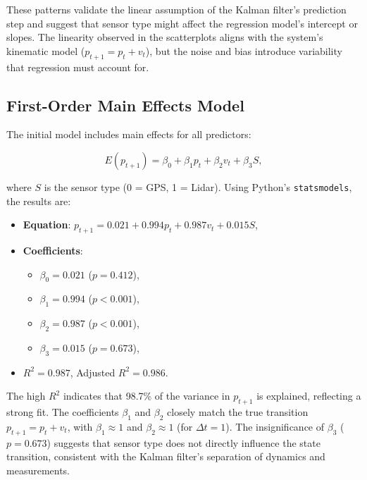 \documentclass[12pt]{article}
\begin{document}
These patterns validate the linear assumption of the Kalman filter’s prediction step and suggest that sensor type might affect the regression model’s intercept or slopes. The linearity observed in the scatterplots aligns with the system’s kinematic model (\( p_{t+1} = p_t + v_t \)), but the noise and bias introduce variability that regression must account for.

\subsection{First-Order Main Effects Model}
\label{subsec:main_effects}

The initial model includes main effects for all predictors:

\begin{equation}
    E(p_{t+1}) = \beta_0 + \beta_1 p_t + \beta_2 v_t + \beta_3 S,
    \label{eq:main_effects}
\end{equation}

where \( S \) is the sensor type (0 = GPS, 1 = Lidar). Using Python’s \texttt{statsmodels}, the results are:

\begin{itemize}
    \item \textbf{Equation}: \( p_{t+1} = 0.021 + 0.994 p_t + 0.987 v_t + 0.015 S \),
    \item \textbf{Coefficients}:
    \begin{itemize}
        \item \( \beta_0 = 0.021 \) (\( p = 0.412 \)),
        \item \( \beta_1 = 0.994 \) (\( p < 0.001 \)),
        \item \( \beta_2 = 0.987 \) (\( p < 0.001 \)),
        \item \( \beta_3 = 0.015 \) (\( p = 0.673 \)),
    \end{itemize}
    \item \( R^2 = 0.987 \), Adjusted \( R^2 = 0.986 \).
\end{itemize}

The high \( R^2 \) indicates that 98.7\% of the variance in \( p_{t+1} \) is explained, reflecting a strong fit. The coefficients \( \beta_1 \) and \( \beta_2 \) closely match the true transition \( p_{t+1} = p_t + v_t \), with \( \beta_1 \approx 1 \) and \( \beta_2 \approx 1 \) (for \( \Delta t = 1 \)). The insignificance of \( \beta_3 \) (\( p = 0.673 \)) suggests that sensor type does not directly influence the state transition, consistent with the Kalman filter’s separation of dynamics and measurements.
\end{document}
